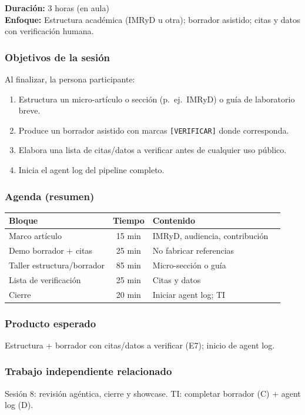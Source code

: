 \textbf{Duración:} 3 horas (en aula)\\
\textbf{Enfoque:} Estructura académica (IMRyD u otra); borrador asistido; citas y datos con verificación humana.

\subsubsection*{Objetivos de la sesión}
Al finalizar, la persona participante:
\begin{enumerate}
\item Estructura un micro-artículo o sección (p.\ ej.\ IMRyD) o guía de laboratorio breve.
\item Produce un borrador asistido con marcas \texttt{[VERIFICAR]} donde corresponda.
\item Elabora una lista de citas/datos a verificar antes de cualquier uso público.
\item Inicia el agent log del pipeline completo.
\end{enumerate}

\subsubsection*{Agenda (resumen)}
\begin{tabularx}{\textwidth}{@{}lclX@{}}
\toprule
Bloque & Tiempo & Contenido \\
\midrule
Marco artículo & 15 min & IMRyD, audiencia, contribución \\
Demo borrador + citas & 25 min & No fabricar referencias \\
Taller estructura/borrador & 85 min & Micro-sección o guía \\
Lista de verificación & 25 min & Citas y datos \\
Cierre & 20 min & Iniciar agent log; TI \\
\bottomrule
\end{tabularx}

\subsubsection*{Producto esperado}
Estructura + borrador con citas/datos a verificar (E7); inicio de agent log.

\subsubsection*{Trabajo independiente relacionado}
Sesión 8: revisión agéntica, cierre y showcase. TI: completar borrador (C) + agent log (D).
